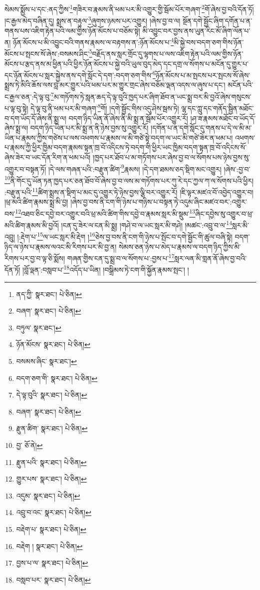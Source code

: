 སེམས་སྨྱོས་པ་དང་:ནད་ཀྱིས་\footnote{ནད་ཀྱི་  སྣར་ཐང་།  པེ་ཅིན། }གཟིར་བ་རྣམས་ནི་ཕམ་པར་མི་འགྱུར་གྱི་སྦོམ་པོར་གཞག་\footnote{བཞག་  སྣར་ཐང་།  པེ་ཅིན། }གོ་ཞེས་བྱ་བའི་དོན་ཏོ། །ང་རྒྱལ་མེད་བཞིན་དུ། སྨྲས་ན་བརྟུལ་\footnote{བཏུལ་  སྣར་ཐང་། }ཞུགས་ཉམས་པར་འགྱུར། །ཞེས་བྱ་བ་ལ། སྔོན་དགེ་སྦྱོང་ཞིག་དགོན་པ་ན་གནས་པས་འཇིག་རྟེན་པའི་ལམ་གྱིས་ཉོན་མོངས་པ་བཅོམ་སྟེ། མི་འབྱུང་བར་བྱས་ནས་ཡུན་རིང་མོ་ཞིག་ལོན་པ་ན། ཉོན་མོངས་པ་མི་འབྱུང་བའི་གནས་རྣམས་ལ་བརྟགས་ན་:ཉོན་མོངས་པ་\footnote{ཉོན་མོངས་  སྣར་ཐང་།  པེ་ཅིན། }མི་སྐྱེ་བས་བདག་ཅག་གིས་ཉོན་མོངས་པ་སྤངས་སོ་ཞེས་:བསམས་ཤིང་\footnote{བསམས་ཞིང་  སྣར་ཐང་། }བརྗོད་ནས་སླར་གྲོང་དུ་ལྷགས་པ་ལས་འཇིག་རྟེན་པའི་ལམ་གྱིས་ཉོན་མོངས་པ་རྩད་ནས་མ་ཕྱིན་པའི་ཕྱིར་ཉོན་མོངས་པ་སྐྱེ་བའི་ཡུལ་བུད་མེད་དང་དགྲ་ལ་སོགས་པ་མངོན་དུ་གྱུར་པ་དང་ཉོན་མོངས་པ་སླར་སྐྱེས་ནས་དགེ་སློང་དེ་དག་:བདག་ཅག་གིས་\footnote{བདག་ཅག་གི་  སྣར་ཐང་།  པེ་ཅིན། }ཉོན་མོངས་པ་མ་སྤངས་པར་སྤངས་སོ་ཞེས་སྨྲས་ཏེ་མིའི་ཆོས་ལས་བླ་མར་གྱུར་པའི་ཕམ་པར་མ་གྱུར་གྲང་ཞེས་བཅོམ་ལྡན་འདས་ལ་ཞུས་པ་དང་། མངོན་པའི་ང་རྒྱལ་ཅན་:དེ་ལྟ་བུ་\footnote{དེ་ལྟ་བུའི་  སྣར་ཐང་།  པེ་ཅིན། }མ་གཏོགས་ཏེ་སླན་ཆད་དེ་ལྟ་བུའི་ཁྱད་པར་ཞིག་ཐོབ་ན་ཡང་སྨྲ་བར་མི་བྱའོ་ཞེས་གསུངས་པ་ལྟ་བུ་སྟེ། དེ་ལྟ་བུ་ནི་ཕམ་པར་མི་གཞག་\footnote{བཞག་  སྣར་ཐང་།  པེ་ཅིན། }གོ། །དགེ་སྦྱོང་གིས་འདུ་ཤེས་སྦས་ཏེ། ལྷ་དང་ཀླུ་དང་གནོད་སྦྱིན་མཐོང་བ་དག་ཡོད་དོ་ཞེས་ནི་སྨྲ་ལ། བདག་ཉིད་ཡིན་ནོ་ཞེས་ནི་མི་སྨྲ་ན་སྦོམ་པོར་འགྱུར་རོ། །ཤ་ཟ་རྣམས་མཐོང་བ་ཡོད་དོ་ཞེས་སྨྲ་ལ། བདག་ཉིད་ཡིན་པར་མི་སྨྲ་ན་ནི་ཉེས་བྱས་སུ་འགྱུར་རོ། །དགོན་པ་ན་དགེ་སློང་དུ་གནས་པ་དེ་ལ་མི་མ་ཡིན་པ་རྣམས་ཀྱིས་གཙེས་པ་ལས་འཕགས་པ་རྣམས་ལ་མི་གཙེ་སྟེ་བདག་ལ་ཡང་མི་གཙེ་ཟེར་ན་ཕམ་པ། འཕགས་པ་རྣམས་ཀྱི་ཕྱིར་ཁྱིམ་བདག་རྣམས་སྟན་ཁྲ་བོ་འདིངས་ཏེ་བདག་གི་ཕྱིར་ཡང་ཁྱིམ་བདག་སྟན་ཁྲ་བོ་འདིངས་སོ་ཞེས་ཟེར་བ་ཡང་དོན་རིག་ན་ཕམ་པའོ། །ཁྱད་པར་ཐོབ་པ་མ་གཏོགས་པར་ཞེས་བྱ་བ་ལ་སོགས་པས་ཉེས་བྱས་སུ་འགྱུར་བ་བསྟན་ཏོ། །དེ་ལས་གཞན་པའི་:བརྫུན་ཚིག་\footnote{རྫུན་ཚིག་  སྣར་ཐང་།  པེ་ཅིན། }རྣམས། །དེ་དག་ཐམས་ཅད་སྡིག་མང་འགྱུར། །ཞེས་:བྱ་བ་\footnote{བྱ་  ཅོ་ནེ། }ནི་གོང་དུ་ཡོན་ཏན་ཁྱད་པར་ཅན་ཐོབ་བོ་ཞེས་བྱ་བ་ལས་མ་གཏོགས་པར་ཀུ་རེ་དང་ཀྱལ་ཀ་ལ་སོགས་པའི་ཕྱིར། :བརྫུན་པའི་\footnote{རྫུན་པའི་  སྣར་ཐང་།  པེ་ཅིན། }ཚིག་སྨྲས་ན་སྡིག་པ་མང་དུ་འགྱུར་ཏེ་ཉེས་བྱས་ལྕི་བར་འགྱུར་རོ། །ཇི་ལྟར་མཛའ་བོ་འབྱེད་འགྱུར་བ། །ཕྲ་མའི་ཚིག་རྣམས་སྨྲ་མི་བྱ། །ཞེས་བྱ་བས་ནི་ངག་གི་ཉེས་པ་གཉིས་པ་བསྟན་ཏེ་འདུམ་ཞིང་མཛའ་བར་:འགྱུར་བས་\footnote{གྱུར་པས་  སྣར་ཐང་།  པེ་ཅིན། }འཐབ་ཅིང་དབྱེ་བར་འགྱུར་བའི་ཕྲ་མའི་ཚིག་གིས་དབྱེ་བ་རྣམས་སླར་མི་སྡུམ་\footnote{འདུམ་  སྣར་ཐང་།  པེ་ཅིན། }ཞིང་དབྱེས་སུ་འགྱུར་བ་ཕྲ་མའི་ཚིག་རྣམས་མི་བྱའོ། །ངན་དུ་ཟེར་ལ་ངན་མི་སྨྲ། །གཤེ་བ་ལ་ཡང་སླར་མི་གཤེ། །མཚང་:འབྲུ་བ་ལ་\footnote{འབྲུ་བ་འང་  སྣར་ཐང་།  པེ་ཅིན། }སླར་མི་འབྲུ། །:རྡེག་པ་\footnote{བརྡེག་པ་  སྣར་ཐང་།  པེ་ཅིན། }ལ་ཡང་སླར་མི་རྡེག །\footnote{བརྡེག །  སྣར་ཐང་།  པེ་ཅིན། }ཅེས་བྱ་བས་ནི་ངག་གི་ཉེས་པ་སྤོང་བ་དགེ་སྦྱོང་གི་ཚུལ་བཞི་སྟེ། བདག་ཉིད་ལ་ཉེས་པ་རྣམས་ལའང་མི་རིགས་པར་མི་བྱ་ན། སེམས་ཅན་ཉེས་པ་མེད་པ་རྣམས་ལ་བདག་ཉིད་ཀྱིས་མི་རིགས་པར་བྱ་བ་ལྟ་ཅི་སྨོས། གཞན་གྱིས་ངན་དུ་སྨྲ་བ་ལ་སོགས་པ་:བྱས་པ་\footnote{བྱས་པ་ལ་  སྣར་ཐང་།  པེ་ཅིན། }སླར་ལན་མི་གླན་ནོ་ཞེས་བྱ་བའི་དོན་ཏོ། །བློ་ལྡན་:བསླབ་པ་\footnote{བསླབ་པར་  སྣར་ཐང་།  པེ་ཅིན། }འདོད་པ་ཡིན། །བསྒྲིམས་ཏེ་ངག་གི་སྐྱོན་རྣམས་སྤང་། །
